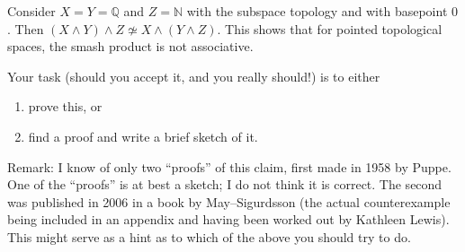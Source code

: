 \documentclass[addpoints,10pt]{exam}
\theoremstyle{plain}
\theoremstyle{definition}
\newtheorem{prob}[thm]{Problem}
\theoremstyle{plain}
\theoremstyle{plain}
\theoremstyle{definition}
\let\oldprob\prob
\let\endoldprob\endprob
\renewenvironment{prob}
  {\begin{singlespace}\oldprob}
  {\endoldprob\end{singlespace}}
\begin{document}
\begin{prob}
Consider $X=Y=\mathbb{Q}$ and $Z=\mathbb{N}$ with the subspace topology and with basepoint $0$. Then $(X\wedge Y)\wedge Z\not\simeq X\wedge(Y\wedge Z)$. This shows that for pointed topological spaces, the smash product is not associative.

Your task (should you accept it, and you really should!) is to either
\begin{enumerate}[label=(\alph*)]
    \item prove this, or
    \item find a proof and write a brief sketch of it.
\end{enumerate}

Remark: I know of only two ``proofs'' of this claim, first made in 1958 by Puppe. One of the ``proofs'' is at best a sketch; I do not think it is correct. The second was published in 2006 in a book by May--Sigurdsson (the actual counterexample being included in an appendix and having been worked out by Kathleen Lewis). This might serve as a hint as to which of the above you should try to do.
\end{prob}
\end{document}
